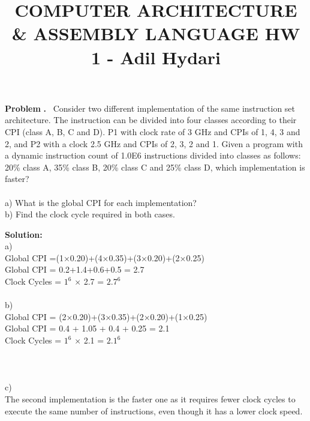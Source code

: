 \documentclass[11pt]{article}
\newcounter{problem}
\newcounter{solution}
\newcommand\Problem{%
	\stepcounter{problem}%
	\textbf{\theproblem.}~%
	\setcounter{solution}{0}%
}
\newcommand\TheSolution{%
	\textbf{Solution:}\\%
}
\begin{document}
\title{\textbf{COMPUTER ARCHITECTURE \& ASSEMBLY LANGUAGE HW 1 - Adil Hydari}}
\maketitle
	\textbf{Problem}
	\Problem {Consider two different implementation of the same instruction set architecture. The instruction can be divided into four classes according to their CPI (class A, B, C and D). P1 with clock rate of 3 GHz and CPIs of 1, 4, 3 and 2, and P2 with a clock 2.5 GHz and CPIs of 2, 3, 2 and 1. Given a program with a dynamic instruction count of 1.0E6 instructions divided into classes as follows: 20\% class A, 35\% class B, 20\% class C and 25\% class D, which implementation is faster?}
	\\
	\\
	\indent a) What is the global CPI for each implementation?
	\\
	\indent b) Find the clock cycle required in both cases.
	
	\TheSolution 
	a) \\
	Global CPI =(1×0.20)+(4×0.35)+(3×0.20)+(2×0.25)\\
	Global CPI = 0.2+1.4+0.6+0.5 = 2.7\\
	Clock Cycles = $1^6$ × 2.7 = $2.7^6$
	\\
	\\ 
	b)\\
	Global CPI = (2×0.20)+(3×0.35)+(2×0.20)+(1×0.25)\\
	Global CPI = 0.4 + 1.05 + 0.4 + 0.25 = 2.1\\
	Clock Cycles = $1^6$ × 2.1 = $2.1^6$\\
	\\
	\\
	\\
	c)\\
	The second implementation is the faster one as it requires fewer clock cycles to execute the same number of instructions, even though it has a lower clock speed.
	
\end{document}
